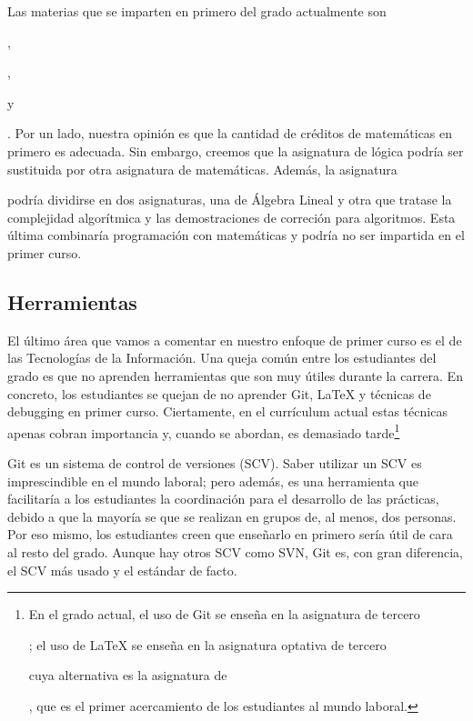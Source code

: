 Las materias que se imparten en primero del grado actualmente son
\subject{Álgebra y Matemática Discreta},
\subject{Fundamentos Lógicos de la Informática}\footnotemark,
\subject{Cálculo} y
\subject{Estadística}.
Por un lado, nuestra opinión es que
la cantidad de créditos de matemáticas en primero es adecuada.
Sin embargo, creemos que la asignatura de lógica
podría ser sustituida por otra asignatura de matemáticas.
Además, la asignatura \subject{Álgebra y Matemática Discreta}
podría dividirse en dos asignaturas,
una de Álgebra Lineal y otra que tratase
la complejidad algorítmica y las demostraciones de correción para algoritmos.
Esta última combinaría programación con matemáticas
y podría no ser impartida en el primer curso.


\subsection{Herramientas}


El último área que vamos a comentar en nuestro enfoque de primer curso
es el de las Tecnologías de la Información.
Una queja común entre los estudiantes del grado es que
no aprenden herramientas que son muy útiles durante la carrera.
En concreto, los estudiantes se quejan de no aprender
Git, \LaTeX{} y técnicas de debugging en primer curso.
Ciertamente, en el currículum actual
estas técnicas apenas cobran importancia y, cuando se abordan,
es demasiado tarde\footnote{En el grado actual, el uso de Git se enseña
en la asignatura de tercero \subject{Tecnologías de Desarrollo Software};
el uso de \LaTeX{} se enseña en la asignatura optativa de tercero
\subject{Tecnologías Específicas de la Ingeniería Informática}
cuya alternativa es la asignatura de \subject{Prácticas Externas},
que es el primer acercamiento de los estudiantes al mundo laboral.}

Git es un sistema de control de versiones (SCV).
Saber utilizar un SCV es imprescindible en el mundo laboral;
pero además,
es una herramienta que facilitaría a los estudiantes la coordinación para
el desarrollo de las prácticas,
debido a que la mayoría se que se realizan en grupos de, al menos, dos personas.
Por eso mismo, los estudiantes creen que enseñarlo en primero
sería útil de cara al resto del grado.
Aunque hay otros SCV como SVN,
Git es, con gran diferencia, el SCV más usado y el estándar de facto.

